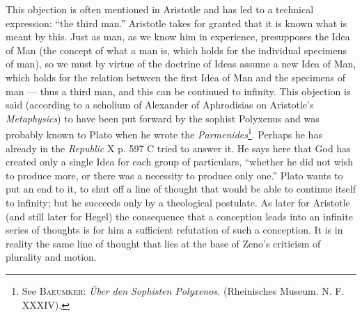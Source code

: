 \documentclass[12pt,a4paper,openany]{book}
\newcommand{\opage}[1]{\marginnote{\footnotesize\textit{[#1]}}}
\begin{document}
This objection is often mentioned in Aristotle and has
led to a technical expression: ``the third man.'' Aristotle
takes for granted that it is known what is meant by this. Just as
man, as we know him in experience, presupposes
the Idea of Man (the concept of what a man is, which
holds for the individual specimens of man), so we must
by virtue of the doctrine of Ideas assume a new Idea of Man, which holds
for the relation between the first Idea of Man and
the specimens of man --- thus a third man, and
this can be continued to infinity. This objection is said
\setcounter{footnote}{0}%
\opage{17}(according to a scholium of Alexander of Aphrodisias on Aristotle’s %
\textit{Metaphysics}) to have been put forward by the sophist Polyxenus and
was probably known to Plato when he wrote the \textit{Parmenides}\footnote[1]{See \textsc{Baeumker}: \textit{Über den Sophisten Polyxenos.} (Rheinisches Museum. N. F. XXXIV).}.
Perhaps he has already in the \textit{Republic} X p. 597 C
tried to answer it. He says here that God has created
only a single Idea for each group of particulars, ``whether
he did not wish to produce more, or there was a necessity
to produce only one.'' Plato wants
to put an end to it, to shut off a line of thought that would
be able to continue itself to infinity; but he succeeds
only by a theological postulate. As later for Aristotle
(and still later for Hegel) the consequence that
a conception leads into an infinite series of thoughts is for him
a sufficient refutation of such a conception. It is
in reality the same line of thought that lies at the base
of Zeno’s criticism of plurality and motion.
\end{document}
